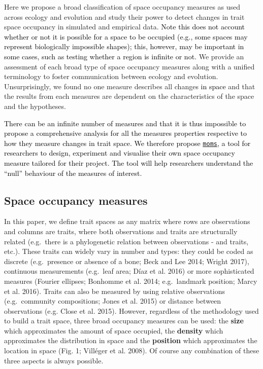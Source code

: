 \documentclass[]{article}
\begin{document}
Here we propose a broad classification of space occupancy measures as
used across ecology and evolution and study their power to detect
changes in trait space occupancy in simulated and empirical data.
\textcolor{black}{Note this does not account whether or
not it is possible for a space to be occupied (e.g., some spaces may
represent biologically impossible shapes); this, however, may be
important in some cases, such as testing whether a region is infinite or
not.} We provide an assessment of each broad type of space occupancy
measures along with a unified terminology to foster communication
between ecology and evolution. Unsurprisingly, we found no one measure
describes all changes \textcolor{black}{in space} and
that the results from each measures are dependent on the characteristics
of the space and the hypotheses.

\textcolor{black}{There can be an infinite number of
measures and that it is thus impossible to propose a comprehensive
analysis for all the measures properties respective to how they measure
changes in trait space. We therefore propose
\href{https://tguillerme.shinyapps.io/moms/}{\texttt{moms}}, a tool for
researchers to design, experiment and visualise their own space
occupancy measure tailored for their project. The tool will help
researchers understand the ``null'' behaviour of the measures of
interest.}

\subsection{Space occupancy measures}\label{space-occupancy-measures}

In this paper, we define trait spaces as any matrix where rows are
observations and columns are traits, where both observations and traits
are structurally related (e.g.~there is a phylogenetic relation between
observations - and traits, etc.). These traits can widely vary in number
and types: they could be coded as discrete (e.g.~presence or absence of
a bone; Beck and Lee 2014; Wright 2017), continuous measurements
(e.g.~leaf area; Díaz et al. 2016) or more sophisticated measures
(Fourier ellipses; Bonhomme et al. 2014; e.g.~landmark position; Marcy
et al. 2016). Traits can also be measured by using relative observations
(e.g.~community compositions; Jones et al. 2015) or distance between
observations (e.g. Close et al. 2015). However, regardless of the
methodology used to build a trait space, three broad occupancy measures
can be used: the \textbf{size} which approximates the amount of space
occupied, the \textbf{density} which approximates the distribution in
space and the \textbf{position} which approximates the location in space
(Fig. 1; Villéger et al. 2008). Of course any combination of these three
aspects is always possible.
\end{document}
